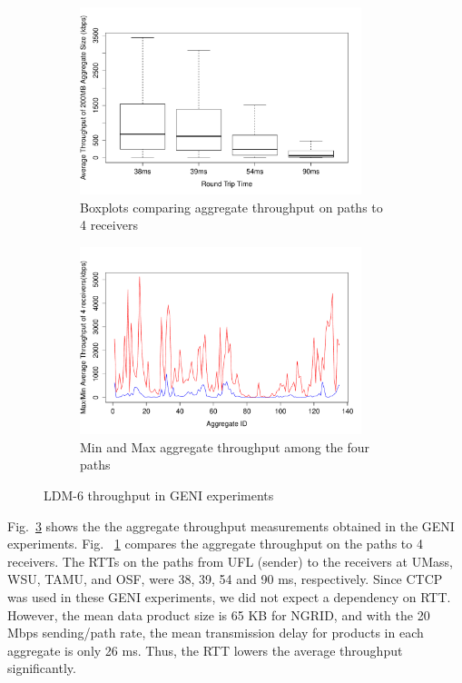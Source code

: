 \begin{figure}
\centering
\begin{subfigure}[b]{0.47\textwidth}
\centering
\includegraphics[width=0.9\textwidth]{figures/GENI_Throughput_BoxPlots_RTT.pdf}
\caption{Boxplots comparing aggregate throughput on paths to 4 receivers}
\label{fig:GENI-4-rcv-boxplots}
\end{subfigure}
\begin{subfigure}[b]{0.47\textwidth}
\centering
\includegraphics[width=0.9\textwidth]{figures/GENI_Throughput_vs_AggregateID.pdf}
\caption{Min and Max aggregate throughput among the four paths}
\label{fig:min-max-throughput-GENI-LDM6}
\end{subfigure}
\caption{LDM-6 throughput in GENI experiments}
\label{fig:GENI-LDM6}
\end{figure}

Fig.~\ref{fig:GENI-LDM6} shows the the aggregate throughput measurements obtained in the GENI
experiments. Fig. ~\ref{fig:GENI-4-rcv-boxplots} compares the aggregate throughput on the paths
to 4 receivers. The RTTs on the paths from  UFL (sender) to the receivers at UMass, WSU, TAMU, and OSF, were 38, 39, 54 and 90 ms, respectively. Since CTCP was used in these GENI experiments, we did not expect a dependency on RTT.
However, the mean data product size is 65 KB for NGRID, and with the 20 Mbps sending/path rate, the mean transmission delay for products in each aggregate is only 26 ms. Thus, the RTT lowers the average throughput significantly.

